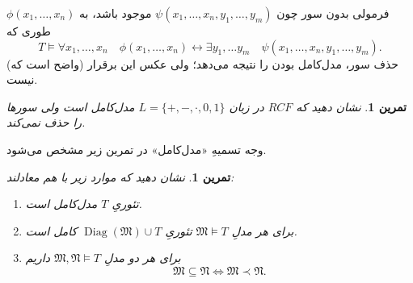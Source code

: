 \documentclass[12pt,a4paper]{report}
\theoremstyle{colorhead}
\newtheorem{tam}[thm]{تمرین}
\DeclareMathOperator{\diag}{Diag}
\begin{document}
$\phi(x_1,\ldots,x_n)$
فرمولی 
بدون سور چون
$\psi(x_1,\ldots,x_n,y_1,\ldots,y_m)$
موجود 
باشد، به طوری که
\[
T\models \forall x_1,\ldots,x_n \quad \phi(x_1,\ldots,x_n)\leftrightarrow \exists y_1,\ldots y_m \quad \psi(x_1,\ldots,x_n,y_1,\ldots,y_m).
\]
(واضح است که)
   حذف
   سور، مدل‌کامل بودن را نتیجه می‌دهد؛ ولی عکس این برقرار نیست.
   \begin{tam}
   نشان دهید که 
   $RCF$
   در زبان
   $L=\{+,-,\cdot,0,1\}$
    مدل‌کامل است ولی سورها را حذف نمی‌کند.
   \end{tam}
وجه تسمیهِ «مدل‌کامل» در تمرین زیر مشخص می‌شود.
  \begin{tam}
  نشان دهید که موارد زیر با هم معادلند:
  \begin{enumerate}
  \item 
  تئوریِ
  $T$
  مدل‌کامل
  است.
  \item 
  برای هر مدلِ
  $\mathfrak{M}\models T$
       تئوریِ
       $\diag(\mathfrak{M})\cup T$
        کامل 
        است.
  \item 
  برای هر دو مدلِ
  $\mathfrak{M},\mathfrak{N}\models T$
  داریم
  \[
  \mathfrak{M}\subseteq \mathfrak{N}\Leftrightarrow \mathfrak{M}\prec \mathfrak{N}.
  \]
  \end{enumerate}
  \end{tam}
\pagebreak
\end{document}

